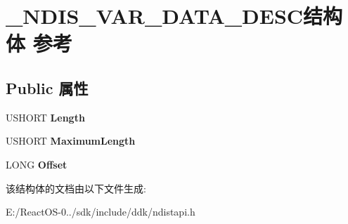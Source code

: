 \hypertarget{struct___n_d_i_s___v_a_r___d_a_t_a___d_e_s_c}{}\section{\+\_\+\+N\+D\+I\+S\+\_\+\+V\+A\+R\+\_\+\+D\+A\+T\+A\+\_\+\+D\+E\+S\+C结构体 参考}
\label{struct___n_d_i_s___v_a_r___d_a_t_a___d_e_s_c}
\subsection*{Public 属性}
\begin{DoxyCompactItemize}
\item 
\mbox{\label{struct___n_d_i_s___v_a_r___d_a_t_a___d_e_s_c_a78424a9b2335c2b4b91ac423ef7ba1bd}} 
U\+S\+H\+O\+RT {\bfseries Length}
\item 
\mbox{\label{struct___n_d_i_s___v_a_r___d_a_t_a___d_e_s_c_a8b8d0e8a6c08d27dbfb37746c340d67f}} 
U\+S\+H\+O\+RT {\bfseries Maximum\+Length}
\item 
\mbox{\label{struct___n_d_i_s___v_a_r___d_a_t_a___d_e_s_c_aceeebc26adfa6082203fd1e1bfd73ee0}} 
L\+O\+NG {\bfseries Offset}
\end{DoxyCompactItemize}


该结构体的文档由以下文件生成\+:\begin{DoxyCompactItemize}
\item 
E\+:/\+React\+O\+S-\/0../sdk/include/ddk/ndistapi.\+h\end{DoxyCompactItemize}
